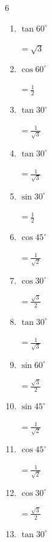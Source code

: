 \begin{multicols}{6}
\begin{enumerate}
        $\displaystyle =\frac{1}{2}$

  \item $\displaystyle \tan{60^\circ}$

        $\displaystyle =\sqrt{3}$

  \item $\displaystyle \cos{60^\circ}$

        $\displaystyle =\frac{1}{2}$

  \item $\displaystyle \tan{30^\circ}$

        $\displaystyle =\frac{1}{\sqrt{3}}$

  \item $\displaystyle \tan{30^\circ}$

        $\displaystyle =\frac{1}{\sqrt{3}}$

  \item $\displaystyle \sin{30^\circ}$

        $\displaystyle =\frac{1}{2}$

  \item $\displaystyle \cos{45^\circ}$

        $\displaystyle =\frac{1}{\sqrt{2}}$

  \item $\displaystyle \cos{30^\circ}$

        $\displaystyle =\frac{\sqrt{3}}{2}$

  \item $\displaystyle \tan{30^\circ}$

        $\displaystyle =\frac{1}{\sqrt{3}}$

  \item $\displaystyle \sin{60^\circ}$

        $\displaystyle =\frac{\sqrt{3}}{2}$

  \item $\displaystyle \sin{45^\circ}$

        $\displaystyle =\frac{1}{\sqrt{2}}$

  \item $\displaystyle \cos{45^\circ}$

        $\displaystyle =\frac{1}{\sqrt{2}}$

  \item $\displaystyle \cos{30^\circ}$

        $\displaystyle =\frac{\sqrt{3}}{2}$

  \item $\displaystyle \tan{30^\circ}$


\end{enumerate}
\end{multicols}
